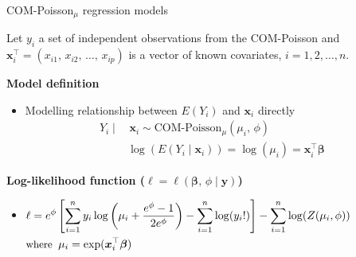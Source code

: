 \documentclass[11pt]{beamer}\usepackage[]{graphicx}\usepackage[]{color}
\begin{document}
\begin{frame}{COM-Poisson$_\mu$ regression models}

  Let $y_i$ a set of independent observations from the COM-Poisson and
  $\bm{x}_i^\top = (x_{i1},\, x_{i2},\, \ldots,\, x_{ip})$ is a vector
  of known covariates, $i=1,2,\ldots,n$.
  \vspace{0.4cm}

  \textbf{Model definition}
  \begin{itemize}
  \item Modelling relationship between $E(Y_i)$ and $\bm{x}_i$
    directly\\[-0.5cm]
    \begin{align*}
      Y_i \mid & \,\bm{x}_i \sim
                 \textrm{COM-Poisson}_\mu(\mu_i,\, \phi) \\
               &\log(E(Y_i \mid \bm{x}_i)) =
                 \log(\mu_i) = \bm{x}_i^\top\bm{\beta} &
    \end{align*}
  \end{itemize}
  \vspace{0.3cm}

  \textbf{Log-likelihood function
    ($\ell = \ell(\bm{\beta},\, \phi \mid \bm{y})$)} \vspace{0.05cm}
  \begin{itemize}
  \item
    $
    \begin{aligned}[t]
      &\ell = e^\phi \left [
        \sum_{i=1}^n y_i
        \log \left( \mu_i + \frac{e^\phi-1}{2e^\phi} \right )
        -\sum_{i=1}^n \log(y_i!) \right ]
      -\sum_{i=1}^n \log(Z(\mu_i, \phi))\\
      &\text{\small where }\:
      \mu_i = \exp(\bm{x}_i^\top\bm{\beta})
    \end{aligned}
    $
  \end{itemize}
\end{frame}
\end{document}

